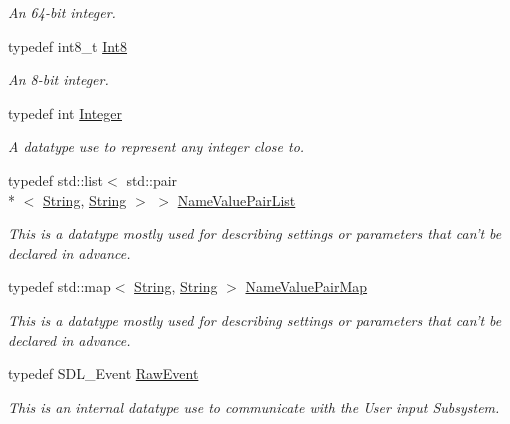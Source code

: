 \begin{DoxyCompactItemize}
\begin{DoxyCompactList}\small\item\em An 64-\/bit integer. \end{DoxyCompactList}\item 
\hypertarget{namespaceMezzanine_acbb048ee99aa07566d5a6eb33f5a2c2d}{typedef int8\-\_\-t \hyperlink{namespaceMezzanine_acbb048ee99aa07566d5a6eb33f5a2c2d}{Int8}}\label{namespaceMezzanine_acbb048ee99aa07566d5a6eb33f5a2c2d}

\begin{DoxyCompactList}\small\item\em An 8-\/bit integer. \end{DoxyCompactList}\item 
typedef int \hyperlink{namespaceMezzanine_ac3576e52af3c62d13dde94829e0c5465}{Integer}
\begin{DoxyCompactList}\small\item\em A datatype use to represent any integer close to. \end{DoxyCompactList}\item 
typedef std\-::list$<$ std\-::pair\\*
$<$ \hyperlink{namespaceMezzanine_acf9fcc130e6ebf08e3d8491aebcf1c86}{String}, \hyperlink{namespaceMezzanine_acf9fcc130e6ebf08e3d8491aebcf1c86}{String} $>$ $>$ \hyperlink{namespaceMezzanine_ac9f30d4ba179aab9013e0c8fbf55bd28}{Name\-Value\-Pair\-List}
\begin{DoxyCompactList}\small\item\em This is a datatype mostly used for describing settings or parameters that can't be declared in advance. \end{DoxyCompactList}\item 
typedef std\-::map$<$ \hyperlink{namespaceMezzanine_acf9fcc130e6ebf08e3d8491aebcf1c86}{String}, \hyperlink{namespaceMezzanine_acf9fcc130e6ebf08e3d8491aebcf1c86}{String} $>$ \hyperlink{namespaceMezzanine_a171daeff3f8f6577a810baf6bb746626}{Name\-Value\-Pair\-Map}
\begin{DoxyCompactList}\small\item\em This is a datatype mostly used for describing settings or parameters that can't be declared in advance. \end{DoxyCompactList}\item 
typedef S\-D\-L\-\_\-\-Event \hyperlink{namespaceMezzanine_ae8d4c0ab783af89a250b0225b75753e5}{Raw\-Event}
\begin{DoxyCompactList}\small\item\em This is an internal datatype use to communicate with the User input Subsystem. \end{DoxyCompactList}\item 

\end{DoxyCompactItemize}

